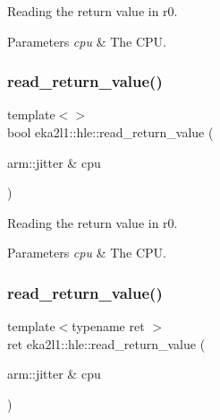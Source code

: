 Reading the return value in r0. 


\begin{DoxyParams}{Parameters}
{\em cpu} & The C\+PU. \\
\hline
\end{DoxyParams}
\mbox{\label{namespaceeka2l1_1_1hle_a1828abc8545af2551c544efc26c2a817}} 
\subsubsection{\texorpdfstring{read\+\_\+return\+\_\+value()}{read\_return\_value()}\hspace{0.1cm}{\footnotesize\ttfamily [4/5]}}
{\footnotesize\ttfamily template$<$$>$ \\
bool eka2l1\+::hle\+::read\+\_\+return\+\_\+value (\begin{DoxyParamCaption}\item[{arm\+::jitter \&}]{cpu }\end{DoxyParamCaption})}



Reading the return value in r0. 


\begin{DoxyParams}{Parameters}
{\em cpu} & The C\+PU. \\
\hline
\end{DoxyParams}
\mbox{\label{namespaceeka2l1_1_1hle_a8ef613fd50bfcf8c9f12277fab20005b}} 
\subsubsection{\texorpdfstring{read\+\_\+return\+\_\+value()}{read\_return\_value()}\hspace{0.1cm}{\footnotesize\ttfamily [5/5]}}
{\footnotesize\ttfamily template$<$typename ret $>$ \\
ret eka2l1\+::hle\+::read\+\_\+return\+\_\+value (\begin{DoxyParamCaption}\item[{arm\+::jitter \&}]{cpu }\end{DoxyParamCaption})}



